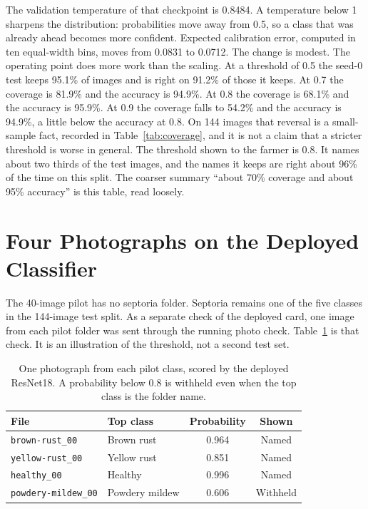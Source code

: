 The validation temperature of that checkpoint is 0.8484. A temperature below 1 sharpens the distribution: probabilities move away from 0.5, so a class that was already ahead becomes more confident. Expected calibration error, computed in ten equal-width bins, moves from 0.0831 to 0.0712. The change is modest. The operating point does more work than the scaling. At a threshold of 0.5 the seed-0 test keeps 95.1\% of images and is right on 91.2\% of those it keeps. At 0.7 the coverage is 81.9\% and the accuracy is 94.9\%. At 0.8 the coverage is 68.1\% and the accuracy is 95.9\%. At 0.9 the coverage falls to 54.2\% and the accuracy is 94.9\%, a little below the accuracy at 0.8. On 144 images that reversal is a small-sample fact, recorded in Table~\ref{tab:coverage}, and it is not a claim that a stricter threshold is worse in general. The threshold shown to the farmer is 0.8. It names about two thirds of the test images, and the names it keeps are right about 96\% of the time on this split. The coarser summary ``about 70\% coverage and about 95\% accuracy'' is this table, read loosely.

\section{Four Photographs on the Deployed Classifier}
The 40-image pilot has no septoria folder. Septoria remains one of the five classes in the 144-image test split. As a separate check of the deployed card, one image from each pilot folder was sent through the running photo check. Table~\ref{tab:spot} is that check. It is an illustration of the threshold, not a second test set.

\begin{table}[H]
\centering
\caption{One photograph from each pilot class, scored by the deployed ResNet18. A probability below 0.8 is withheld even when the top class is the folder name.}
\label{tab:spot}
\begin{tabular}{llcc}
\toprule
\textbf{File} & \textbf{Top class} & \textbf{Probability} & \textbf{Shown} \\
\midrule
\texttt{brown-rust\_00} & Brown rust & 0.964 & Named \\
\texttt{yellow-rust\_00} & Yellow rust & 0.851 & Named \\
\texttt{healthy\_00} & Healthy & 0.996 & Named \\
\texttt{powdery-mildew\_00} & Powdery mildew & 0.606 & Withheld \\
\bottomrule
\end{tabular}
\end{table}

